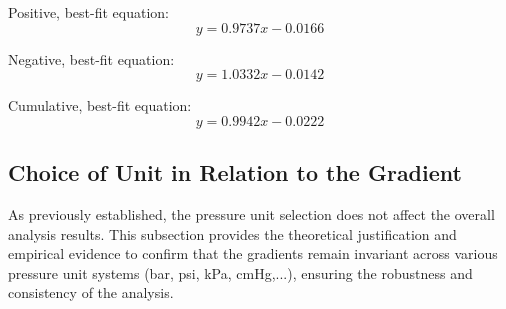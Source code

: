 \documentclass{article}
\begin{document}
\begin{center}
	\hspace*{-2em}
	\begin{minipage}{1.1\textwidth}
		\begin{minipage}{0.3\textwidth}	\centering
			Positive, best-fit equation: 
			\[y = 0.9737x-0.0166\]
		\end{minipage}\hfill
		\begin{minipage}{0.3\textwidth}	\centering
			Negative, best-fit equation: 
			\[y = 1.0332x-0.0142\]
		\end{minipage}\hfill
		\begin{minipage}{0.3\textwidth}	\centering
			Cumulative, best-fit equation: 
			\[y = 0.9942x-0.0222\]
		\end{minipage}
	\end{minipage}
\end{center}
	
\subsection{Choice of Unit in Relation to the Gradient}\label{consistency}
As previously established, the pressure unit selection does not affect the overall analysis results. This subsection provides the theoretical justification and empirical evidence to confirm that the gradients remain invariant across various pressure unit systems (bar, psi, kPa, cmHg,...), ensuring the robustness and consistency of the analysis.\vspace{-1em}
\end{document}
